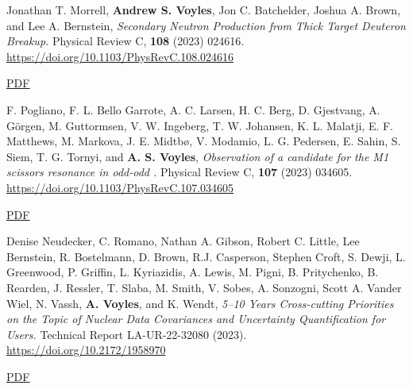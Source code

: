\begin{bibsection}
\item Jonathan T. Morrell, \textbf{Andrew S. Voyles}, Jon C. Batchelder, Joshua A. Brown, and Lee A. Bernstein, \emph{Secondary Neutron Production from Thick Target Deuteron Breakup.} Physical Review C, \textbf{108} (2023) 024616. \url{https://doi.org/10.1103/PhysRevC.108.024616}

\ifshort \vspace{0.1cm} \href{https://avoyles.github.io/papers/Morrell2023_dbreakup.pdf}{\underline{PDF}} \else  \fi




\item F. Pogliano, F. L. Bello Garrote, A. C. Larsen, H. C. Berg, D. Gjestvang, A. Görgen, M. Guttormsen, V. W. Ingeberg, T. W. Johansen, K. L. Malatji, E. F. Matthews, M. Markova, J. E. Midtbø, V. Modamio, L. G. Pedersen, E. Sahin, S. Siem, T. G. Tornyi, and \textbf{A. S. Voyles}, \emph{Observation of a candidate for the M1 scissors resonance in odd-odd .} Physical Review C, \textbf{107} (2023) 034605. \url{https://doi.org/10.1103/PhysRevC.107.034605}

\ifshort \vspace{0.1cm} \href{https://avoyles.github.io/papers/Pogliano2023_166Ho.pdf}{\underline{PDF}} \else  \fi



\item Denise Neudecker, C. Romano, Nathan A. Gibson, Robert C. Little, Lee Bernstein, R. Bostelmann, D. Brown, R.J. Casperson, Stephen Croft, S. Dewji, L. Greenwood, P. Griffin, L. Kyriazidis, A. Lewis, M. Pigni, B. Pritychenko, B. Rearden, J. Ressler, T. Slaba, M. Smith, V. Sobes, A. Sonzogni, Scott A. Vander Wiel, N. Vassh, \textbf{A.  Voyles}, and K. Wendt, \emph{5--10 Years Cross-cutting Priorities on the Topic of Nuclear Data Covariances and Uncertainty Quantification for Users.} Technical Report LA-UR-22-32080  (2023). \url{https://doi.org/10.2172/1958970} 

\ifshort \vspace{0.1cm} \href{https://avoyles.github.io/papers/Neudecker2023_UQ_Short.pdf}{\underline{PDF}} \else  \fi 




\end{bibsection}
